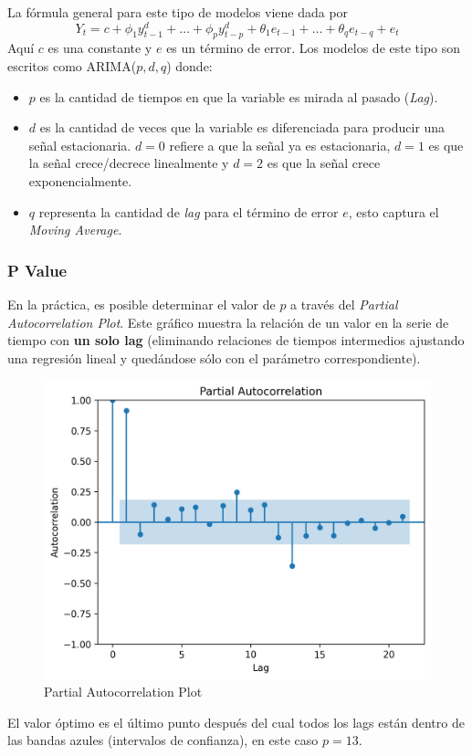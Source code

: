 La fórmula general para este tipo de modelos viene dada por 
$$
Y_t = c + \phi_1y^d_{t-1} + \dots + \phi_py^d_{t-p} + \theta_1e_{t-1} + \dots + \theta_q e_{t-q} + e_t
$$
Aquí $c$ es una constante y $e$ es un término de error. Los modelos de este tipo son escritos como ARIMA($p,d,q$) donde: 

\begin{itemize}
    \item $p$ es la cantidad de tiempos en que la variable es mirada al pasado (\textit{Lag}).
    \item $d$ es la cantidad de veces que la variable es diferenciada para producir una señal estacionaria. $d=0$ refiere a que la señal ya es estacionaria, $d=1$ es que la señal crece/decrece linealmente y $d=2$ es que la señal crece exponencialmente. 
    \item $q$ representa la cantidad de \textit{lag} para el término de error $e$, esto captura el \textit{Moving Average}.
\end{itemize}

\subsubsection{P Value}

En la práctica, es posible determinar el valor de $p$ a través del \textit{Partial Autocorrelation Plot}. Este gráfico muestra la relación de un valor en la serie de tiempo con \textbf{un solo lag} (eliminando relaciones de tiempos intermedios ajustando una regresión lineal y quedándose sólo con el parámetro correspondiente).
\begin{figure}[H]
    \center
    \includegraphics[scale=0.5]{notebooks/ML/img/partial_autocorrelation.png}
    \caption{Partial Autocorrelation Plot}
\end{figure}
El valor óptimo es el último punto después del cual todos los lags están dentro de las bandas azules (intervalos de confianza), en este caso $p=13$. 

